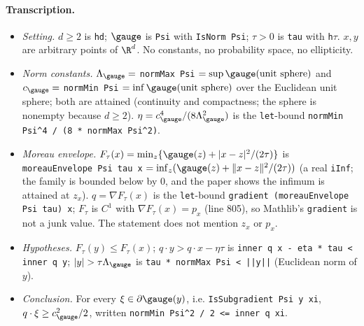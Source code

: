 \paragraph{Transcription.}
\begin{itemize}
\item \emph{Setting.} $d\ge2$ is \texttt{hd}; $\gauge$ is \texttt{Psi} with \texttt{IsNorm Psi}; $\tau>0$ is \texttt{tau} with \texttt{h$\tau$}.
 $x,y$ are arbitrary points of $\R^d$. No constants, no probability space, no ellipticity.
\item \emph{Norm constants.} $\Lambda_\gauge=$ \texttt{normMax Psi} $=\sup\gauge(\text{unit sphere})$ and $c_\gauge=$ \texttt{normMin Psi}
 $=\inf\gauge(\text{unit sphere})$ over the Euclidean unit sphere; both are attained (continuity and compactness; the sphere is
 nonempty because $d\ge2$). $\eta=c_\gauge^4/(8\Lambda_\gauge^2)$ is the \texttt{let}-bound
 \texttt{normMin Psi\^{}4 / (8 * normMax Psi\^{}2)}.
\item \emph{Moreau envelope.} $F_\tau(x)=\min_z\{\gauge(z)+|x-z|^2/(2\tau)\}$ is
 \texttt{moreauEnvelope Psi tau x} $=\inf_z(\gauge(z)+\|x-z\|^2/(2\tau))$ (a real \texttt{iInf}; the family is bounded below by $0$, and the
 paper shows the infimum is attained at $z_x$). $q=\nabla F_\tau(x)$ is the \texttt{let}-bound
 \texttt{gradient (moreauEnvelope Psi tau) x}; $F_\tau$ is $C^1$ with $\nabla F_\tau(x)=p_x$ (line 805), so Mathlib's \texttt{gradient}
 is not a junk value. The statement does not mention $z_x$ or $p_x$.
\item \emph{Hypotheses.} $F_\tau(y)\le F_\tau(x)$; $q\cdot y>q\cdot x-\eta\tau$ is \texttt{inner q x - eta * tau < inner q y};
 $|y|>\tau\Lambda_\gauge$ is \texttt{tau * normMax Psi < ||y||} (Euclidean norm of $y$).
\item \emph{Conclusion.} For every $\xi\in\partial\gauge(y)$, i.e. \texttt{IsSubgradient Psi y xi}, $q\cdot\xi\ge c_\gauge^2/2$, written
 \texttt{normMin Psi\^{}2 / 2 <= inner q xi}.
\end{itemize}
